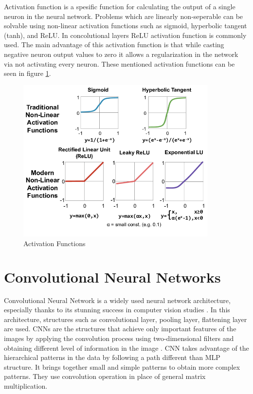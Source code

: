 Activation function is a spesific function for calculating the output of a single neuron in the neural network. Problems which are linearly non-seperable can be solvable using non-linear activation functions such as sigmoid, hyperbolic tangent (tanh), and ReLU. In concolutional layers ReLU activation function is commonly used. The main advantage of this activation function is that while casting negative neuron output values to zero it allows a regularization in the network via not activating every neuron. These mentioned activation functions can be seen in figure \ref{fig:activation_functions}.

\begin{figure}[h]
    \centering
    \includegraphics[width=10cm]{figures/chapter3/activation_functions.png}
    \caption{Activation Functions \cite{activation_functions}}
    \label{fig:activation_functions}
\end{figure}

\section{Convolutional Neural Networks}

Convolutional Neural Network is a widely used neural network architecture, especially thanks to its stunning success in computer vision studies \cite{leNet}. In this architecture, structures such as convolutional layer, pooling layer, flattening layer are used. CNNs are the structures that achieve only important features of the images by applying the convolution process using two-dimensional filters and obtaining different level of information in the image \cite{CNN_review}. CNN takes advantage of the hierarchical patterns in the data by following a path different than MLP structure. It brings together small and simple patterns to obtain more complex patterns. They use convolution operation in place of general matrix multiplication.


